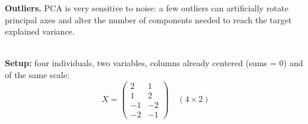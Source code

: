 \documentclass[10pt,a4paper]{article}
\begin{document}
\vspace{3pt}
\begin{tcolorbox}[
    colframe=accentred,
    colback=white,
    arc=1.5mm,
    boxrule=0.5pt,
    left=8pt, right=8pt, top=4pt, bottom=4pt
]
\textbf{\color{accentred}Outliers.} PCA is very sensitive to noise: a few outliers can artificially rotate principal axes and alter the number of components needed to reach the target explained variance.
\end{tcolorbox}

\newpage

\\[3pt]
\textbf{Setup:} four individuals, two variables, columns already centered (sums = 0) and of the same scale:
\[
X = \begin{pmatrix} 2 & 1 \\ 1 & 2 \\ -1 & -2 \\ -2 & -1 \end{pmatrix} \quad (4 \times 2)
\]
\end{document}
